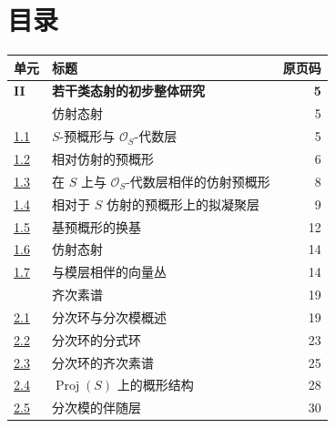 \documentclass[UTF8,fontset=none,11pt,oneside,openany]{ctexbook}
\providecommand{\Proj}{\operatorname{Proj}}
\newcommand{\oldpage}[2][]{%
  \hypertarget{ega-source-page-#1-#2}{}%
  \marginnote{\scriptsize\textbf{#1}~|~#2}\ignorespaces}
\begin{document}

\endgroup

\clearpage
\oldpage[II]{212}
\thispagestyle{empty}
\mbox{}

\clearpage
\oldpage[II]{213}
{}
\section*{目录}
\thispagestyle{plain}

\begingroup
\small
\renewcommand{\arraystretch}{1.04}
\begin{longtable}{@{}p{}p{}r@{}}
\textbf{单元} & \textbf{标题} & \textbf{原页码}\\
\hline
\textbf{II} & \textbf{若干类态射的初步整体研究} & \textbf{5}\\
\hyperref[section:II.1-zh]{\textsection1} & 仿射态射 & 5\\
\hyperref[subsection:II.1.1-zh]{1.1} & $S$-预概形与 $\mathcal{O}_S$-代数层 & 5\\
\hyperref[subsection:II.1.2-zh]{1.2} & 相对仿射的预概形 & 6\\
\hyperref[subsection:II.1.3-zh]{1.3} & 在 $S$ 上与 $\mathcal{O}_S$-代数层相伴的仿射预概形 & 8\\
\hyperref[subsection:II.1.4-zh]{1.4} & 相对于 $S$ 仿射的预概形上的拟凝聚层 & 9\\
\hyperref[II.1.5-zh]{1.5} & 基预概形的换基 & 12\\
\hyperref[II.1.6-zh]{1.6} & 仿射态射 & 14\\
\hyperref[II.1.7-zh]{1.7} & 与模层相伴的向量丛 & 14\\
\hyperref[section:II.2-zh]{\textsection2} & 齐次素谱 & 19\\
\hyperref[subsection:II.2.1-zh]{2.1} & 分次环与分次模概述 & 19\\
\hyperref[subsection:II.2.2-zh]{2.2} & 分次环的分式环 & 23\\
\hyperref[subsection:II.2.3-zh]{2.3} & 分次环的齐次素谱 & 25\\
\hyperref[subsection:II.2.4-zh]{2.4} & $\Proj(S)$ 上的概形结构 & 28\\
\hyperref[subsection:II.2.5-zh]{2.5} & 分次模的伴随层 & 30\\

\end{longtable}
\end{document}
